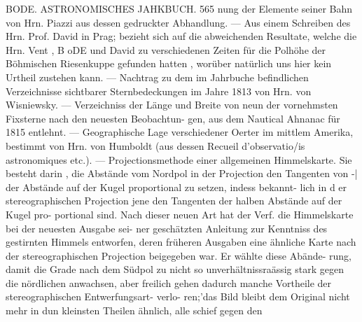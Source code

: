 \documentclass[12pt,a4paper]{article}
\begin{document}
\newpage
BODE. ASTRONOMISCHES JAHKBUCH. 565\newline
nung der Elemente seiner Bahn von Hrn. Piazzi aus dessen gedruckter Abhandlung. --- Aus einem\newline
Schreiben des Hrn. Prof. David in Prag; bezieht sich auf die abweichenden Resultate, welche die Hrn.\newline
Vent , B oDE und David zu verschiedenen Zeiten für die Polhöhe der Böhmischen Riesenkuppe gefunden\newline
hatten , worüber natürlich uns hier kein Urtheil zustehen kann. --- Nachtrag zu dem im Jahrbuche befindlichen Verzeichnisse sichtbarer Sternbedeckungen im Jahre 1813 von Hrn. von Wisniewsky. ---\newline
Verzeichniss der Länge und Breite von neun der vornehmsten Fixsterne nach den neuesten Beobachtun-\newline
gen, aus dem Nautical Ahnanac für 1815 entlehnt. --- Geographische Lage verschiedener Oerter im\newline
mittlem Amerika, bestimmt von Hrn. von Humboldt (aus dessen Recueil d'observatio/is astronomiques etc.). ---\newline
Projectionsmethode einer allgemeinen Himmelskarte. Sie besteht darin , die Abstände vom Nordpol in\newline
der Projection den Tangenten von -| der Abstände auf der Kugel proportional zu setzen, indess bekannt-\newline
lich in d er stereographischen Projection jene den Tangenten der halben Abstände auf der Kugel pro-\newline
portional sind. Nach dieser neuen Art hat der Verf. die Himmelskarte bei der neuesten Ausgabe sei-\newline
ner geschätzten Anleitung zur Kenntniss des gestirnten Himmels entworfen, deren früheren Ausgaben\newline
eine ähnliche Karte nach der stereographischen Projection beigegeben war. Er wählte diese Abände-\newline
rung, damit die Grade nach dem Südpol zu nicht so unverhältnissraässig stark gegen die nördlichen\newline
anwachsen, aber freilich gehen dadurch manche Vortheile der stereographischen Entwerfungsart- verlo-\newline
ren;'das Bild bleibt dem Original nicht mehr in dun kleinsten Theilen ähnlich, alle schief gegen den\newline
\end{document}
